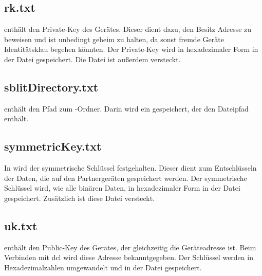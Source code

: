\subsection{rk.txt}
 enthält den Private-Key des Gerätes. Dieser dient dazu, den Besitz Adresse zu beweisen und ist unbedingt geheim zu halten, da sonst fremde Geräte Identitätsklau begehen könnten. Der Private-Key wird in hexadezimaler Form in der Datei gespeichert. Die Datei ist außerdem versteckt.

\subsection{sblitDirectory.txt}
 enthält den Pfad zum \sblit-Ordner. Darin wird ein  gespeichert, der den Dateipfad enthält. 

\subsection{symmetricKey.txt} \label{symmetricKey}
In  wird der symmetrische Schlüssel festgehalten. Dieser dient zum Entschlüsseln der Daten, die auf den Partnergeräten gespeichert werden. Der symmetrische Schlüssel wird, wie alle binären Daten, in hexadezimaler Form in der Datei gespeichert. Zusätzlich ist diese Datei versteckt.

\subsection{uk.txt}
 enthält den Public-Key des Gerätes, der gleichzeitig die Geräteadresse ist. Beim Verbinden mit \gls{dcl} wird diese Adresse bekanntgegeben. Der Schlüssel werden in Hexadezimalzahlen umgewandelt und in der Datei gespeichert.
